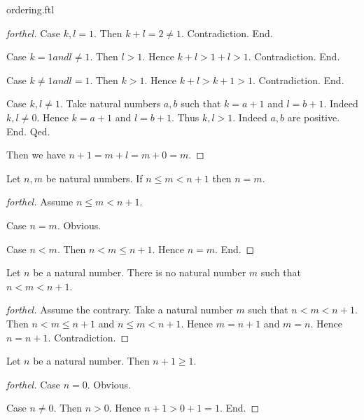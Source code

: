 \documentclass{naproche-library}
\begin{document}
\begin{smodule}{ordering.ftl}
\begin{proof}[forthel]
      Case $k,l = 1$.
        Then $k + l
          = 2
          \neq 1$.
        Contradiction.
      End.

      Case $k = 1 and l \neq 1$.
        Then $l > 1$.
        Hence $k + l
          > 1 + l
          > 1$.
        Contradiction.
      End.

      Case $k \neq 1 and l = 1$.
        Then $k > 1$.
        Hence $k + l
          > k + 1
          > 1$.
        Contradiction.
      End.

      Case $k, l \neq 1$.
        Take natural numbers $a, b$ such that $k = a + 1$ and $l = b + 1$.
        Indeed $k, l \neq 0$.
        Hence $k = a + 1$ and $l = b + 1$.
        Thus $k, l > 1$. Indeed $a, b$ are positive.
      End.
    Qed.

    Then we have $n + 1
      = m + l
      = m + 0
      = m$.
  \end{proof}

  \begin{proposition}[forthel,id=ARITHMETIC_04_8792330561650688,printid]
    Let $n, m$ be natural numbers.
    If $n \leq m < n + 1$ then $n = m$.
  \end{proposition}
  \begin{proof}[forthel]
    Assume $n \leq m < n + 1$.

    Case $n = m$. Obvious.

    Case $n < m$.
      Then $n < m \leq n + 1$.
      Hence $n = m$.
    End.
  \end{proof}

  \begin{corollary}[forthel,id=ARITHMETIC_04_1802826644717568,printid]
    Let $n$ be a natural number.
    There is no natural number $m$ such that $n < m < n + 1$.
  \end{corollary}
  \begin{proof}[forthel]
    Assume the contrary.
    Take a natural number $m$ such that $n < m < n + 1$.
    Then $n < m \leq n + 1$ and $n \leq m < n + 1$.
    Hence $m = n + 1$ and $m = n$.
    Hence $n = n + 1$.
    Contradiction.
  \end{proof}

  \begin{proposition}[forthel,id=ARITHMETIC_04_990407185924096,printid]
    Let $n$ be a natural number.
    Then $n + 1 \geq 1$.
  \end{proposition}
  \begin{proof}[forthel]
    Case $n = 0$. Obvious.

    Case $n \neq 0$.
      Then $n > 0$.
      Hence $n + 1 > 0 + 1 = 1$.
    End.
  \end{proof}



\end{smodule}
\end{document}
